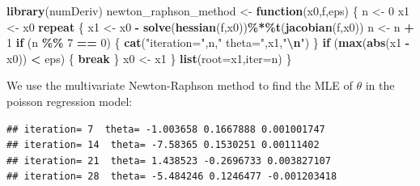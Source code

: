 \documentclass[
]{article}
\newenvironment{Shaded}{\begin{snugshade}}{\end{snugshade}}
\newcommand{\AttributeTok}[1]{\textcolor[rgb]{0.13,0.29,0.53}{#1}}
\newcommand{\CommentTok}[1]{\textcolor[rgb]{0.56,0.35,0.01}{\textit{#1}}}
\newcommand{\ControlFlowTok}[1]{\textcolor[rgb]{0.13,0.29,0.53}{\textbf{#1}}}
\newcommand{\DecValTok}[1]{\textcolor[rgb]{0.00,0.00,0.81}{#1}}
\newcommand{\FloatTok}[1]{\textcolor[rgb]{0.00,0.00,0.81}{#1}}
\newcommand{\FunctionTok}[1]{\textcolor[rgb]{0.13,0.29,0.53}{\textbf{#1}}}
\newcommand{\NormalTok}[1]{#1}
\newcommand{\OtherTok}[1]{\textcolor[rgb]{0.56,0.35,0.01}{#1}}
\newcommand{\SpecialCharTok}[1]{\textcolor[rgb]{0.81,0.36,0.00}{\textbf{#1}}}
\newcommand{\StringTok}[1]{\textcolor[rgb]{0.31,0.60,0.02}{#1}}
\begin{document}
\begin{Shaded}
\begin{Highlighting}[]
\FunctionTok{library}\NormalTok{(numDeriv)}
\NormalTok{newton\_raphson\_method }\OtherTok{\textless{}{-}} \ControlFlowTok{function}\NormalTok{(x0,f,eps)}
\NormalTok{\{}
\NormalTok{  n }\OtherTok{\textless{}{-}} \DecValTok{0}
\NormalTok{  x1 }\OtherTok{\textless{}{-}}\NormalTok{ x0}
  \ControlFlowTok{repeat}
\NormalTok{  \{}
\NormalTok{      x1 }\OtherTok{\textless{}{-}}\NormalTok{ x0 }\SpecialCharTok{{-}} \FunctionTok{solve}\NormalTok{(}\FunctionTok{hessian}\NormalTok{(f,x0))}\SpecialCharTok{\%*\%}\FunctionTok{t}\NormalTok{(}\FunctionTok{jacobian}\NormalTok{(f,x0))}
\NormalTok{      n }\OtherTok{\textless{}{-}}\NormalTok{ n }\SpecialCharTok{+} \DecValTok{1}
      \ControlFlowTok{if}\NormalTok{ (n }\SpecialCharTok{\%\%} \DecValTok{7} \SpecialCharTok{==} \DecValTok{0}\NormalTok{) \{ }\FunctionTok{cat}\NormalTok{(}\StringTok{"iteration="}\NormalTok{,n,}\StringTok{" theta="}\NormalTok{,x1,}\StringTok{"}\SpecialCharTok{\textbackslash{}n}\StringTok{"}\NormalTok{) \}}
      \ControlFlowTok{if}\NormalTok{ (}\FunctionTok{max}\NormalTok{(}\FunctionTok{abs}\NormalTok{(x1 }\SpecialCharTok{{-}}\NormalTok{ x0)) }\SpecialCharTok{\textless{}}\NormalTok{ eps)}
\NormalTok{      \{}
        \ControlFlowTok{break}
\NormalTok{      \}}
\NormalTok{      x0 }\OtherTok{\textless{}{-}}\NormalTok{ x1}
\NormalTok{  \}}
  \FunctionTok{list}\NormalTok{(}\AttributeTok{root=}\NormalTok{x1,}\AttributeTok{iter=}\NormalTok{n)}
\NormalTok{\}}
\end{Highlighting}
\end{Shaded}

We use the multivariate Newton-Raphson method to find the MLE of
\(\theta\) in the poisson regression model:

\begin{Shaded}
\end{Shaded}

\begin{verbatim}
## iteration= 7  theta= -1.003658 0.1667888 0.001001747 
## iteration= 14  theta= -7.58365 0.1530251 0.00111402 
## iteration= 21  theta= 1.438523 -0.2696733 0.003827107 
## iteration= 28  theta= -5.484246 0.1246477 -0.001203418
\end{verbatim}
\end{document}

